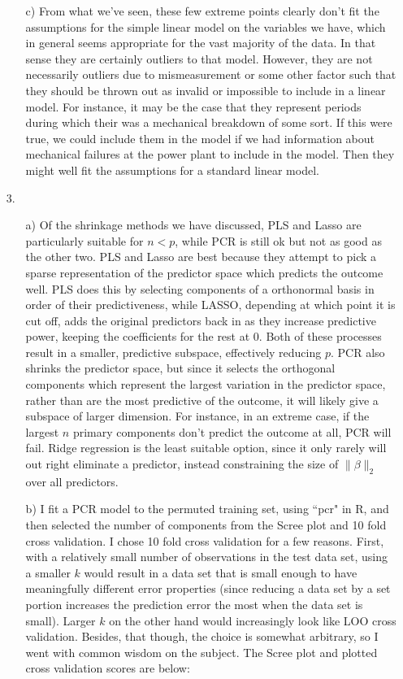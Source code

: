 \documentclass[11pt]{article}
\theoremstyle{definition}
\begin{document}
\begin{itemize}
\begin{itemize}
\begin{itemize}
                    
                \end{itemize}
            \item[c)]
                From what we've seen, these few extreme points clearly don't fit the assumptions for the simple linear model on the variables we have, which in general seems appropriate for the vast majority of the data. In that sense they are certainly outliers to that model. However, they are not necessarily outliers due to mismeasurement or some other factor such that they should be thrown out as invalid or impossible to include in a linear model. For instance, it may be the case that they represent periods during which their was a mechanical breakdown of some sort. If this were true, we could include them in the model if we had information about mechanical failures at the power plant to include in the model. Then they might well fit the assumptions for a standard linear model. 
        \end{itemize}
    \item[3.]
        \begin{itemize}
            \item[a)]
                Of the shrinkage methods we have discussed, PLS and Lasso are particularly suitable for $n<p$, while PCR is still ok but not as good as the other two. PLS and Lasso are best because they attempt to pick a sparse representation of the predictor space which predicts the outcome well. PLS does this by selecting components of a orthonormal basis in order of their predictiveness, while LASSO, depending at which point it is cut off, adds the original predictors back in as they increase predictive power, keeping the coefficients for the rest at $0$. Both of these processes result in a smaller, predictive subspace, effectively reducing $p$. PCR also shrinks the predictor space, but since it selects the orthogonal components which represent the largest variation in the predictor space, rather than are the most predictive of the outcome, it will likely give a subspace of larger dimension. For instance, in an extreme case, if the largest $n$ primary components don't predict the outcome at all, PCR will fail. Ridge regression is the least suitable option, since it only rarely will out right eliminate a predictor, instead constraining the size of $\|\beta\|_2$ over all predictors.
            \item[b)]
                I fit a PCR model to the permuted training set, using ``pcr" in R, and then selected the number of components from the Scree plot and 10 fold cross validation. I chose 10 fold cross validation for a few reasons. First, with a relatively small number of observations in the test data set, using a smaller $k$ would result in a data set that is small enough to have meaningfully different error properties (since reducing a data set by a set portion increases the prediction error the most when the data set is small). Larger $k$ on the other hand would increasingly look like LOO cross validation. Besides, that though, the choice is somewhat arbitrary, so I went with common wisdom on the subject. The Scree plot and plotted cross validation scores are below: \\

\end{itemize}
\end{itemize}
\end{document}
